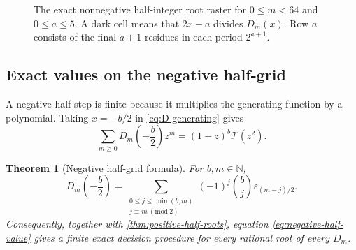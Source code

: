 \documentclass[11pt,oneside]{article}
\newtheorem{theorem}{Theorem}[section]
\theoremstyle{definition}
\theoremstyle{remark}
\newcommand{\N}{\mathbb N}
\newcommand{\eps}{\varepsilon}
\newcommand{\Diag}{D}
\newcommand{\TM}{\mathcal T}
\begin{document}
\begin{figure}[htbp]
\centering
{}
\caption{The exact nonnegative half-integer root raster for
$0\le m<64$ and $0\le a\le5$.  A dark cell means that $2x-a$ divides
$\Diag_m(x)$.  Row $a$ consists of the final $a+1$ residues in each period
$2^{a+1}$.}
\label{fig:root-raster}
\end{figure}

\subsection{Exact values on the negative half-grid}

A negative half-step is finite because it multiplies the generating function
by a polynomial.  Taking $x=-b/2$ in \eqref{eq:D-generating} gives
\begin{equation}
 \sum_{m\ge0}\Diag_m\!\left(-\frac b2\right)z^m
 =(1-z)^b\TM(z^2).
 \label{eq:negative-half-gf}
\end{equation}

\begin{theorem}[Negative half-grid formula]
\label{thm:negative-half}
For $b,m\in\N$,
\begin{equation}
 \boxed{\quad
 \Diag_m\!\left(-\frac b2\right)
 =\sum_{\substack{0\le j\le\min(b,m)\\j\equiv m\ (\mathrm{mod}\ 2)}}
   (-1)^j\binom bj\eps_{(m-j)/2}.
 \quad}
 \label{eq:negative-half-value}
\end{equation}
Consequently, together with \cref{thm:positive-half-roots}, equation
\eqref{eq:negative-half-value} gives a finite exact decision procedure for
every rational root of every $\Diag_m$.
\end{theorem}
\end{document}
